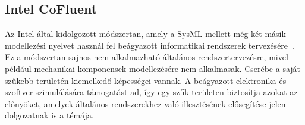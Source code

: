     \subsection{Intel CoFluent}
    Az Intel által kidolgozott módszertan, amely a SysML mellett még két másik modellezési nyelvet használ fel beágyazott informatikai rendszerek tervezésére~\cite{IntelCorporation2014}. Ez a módszertan sajnos nem alkalmazható általános rendszertervezésre, mivel például mechanikai komponensek modellezésére nem alkalmasak.
    Cserébe a saját szűkebb területén kiemelkedő képességei vannak. A beágyazott elektronika és szoftver szimulálására támogatást ad, így egy szűk területen biztosítja azokat az előnyöket, amelyek általános rendszerekhez való illesztésének elősegítése jelen dolgozatnak is a témája.